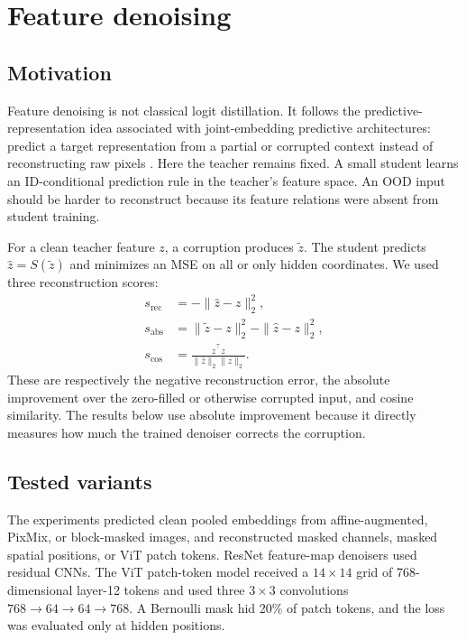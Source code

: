 \section{Feature denoising}

\subsection{Motivation}

\headingindent
Feature denoising is not classical logit distillation. It follows the
predictive-representation idea associated with joint-embedding predictive
architectures: predict a target representation from a partial or corrupted
context instead of reconstructing raw pixels
\cite{lecun2022path,assran2023ijepa}. Here the teacher remains fixed. A small
student learns an ID-conditional prediction rule in the teacher's feature
space. An OOD input should be harder to reconstruct because its feature
relations were absent from student training.

For a clean teacher feature $z$, a corruption produces $\widetilde z$. The
student predicts $\widehat z=S(\widetilde z)$ and minimizes an MSE on all or
only hidden coordinates. We used three reconstruction scores:
\begin{align*}
s_{\mathrm{rec}}&=-\|\widehat z-z\|_2^2,\\
s_{\mathrm{abs}}&=\|\widetilde z-z\|_2^2-\|\widehat z-z\|_2^2,\\
s_{\mathrm{cos}}&=\frac{\widehat z^\top z}{\|\widehat z\|_2\|z\|_2}.
\end{align*}
These are respectively the negative reconstruction error, the absolute
improvement over the zero-filled or otherwise corrupted input, and cosine
similarity. The results below use absolute improvement because it directly
measures how much the trained denoiser corrects the corruption.

\subsection{Tested variants}

\headingindent
The experiments predicted clean pooled embeddings from affine-augmented,
PixMix, or block-masked images, and reconstructed masked channels, masked
spatial positions, or ViT patch tokens. ResNet feature-map denoisers used
residual CNNs. The ViT patch-token model received a $14\times14$ grid of
768-dimensional layer-12 tokens and used three $3\times3$ convolutions
$768\to64\to64\to768$. A Bernoulli mask hid 20\% of patch tokens, and the loss
was evaluated only at hidden positions.

